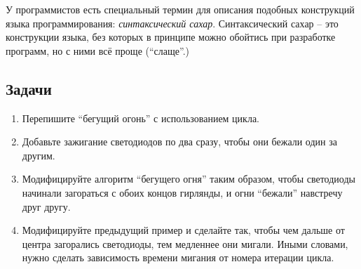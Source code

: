 \documentclass[../sparc.tex]{subfiles}
\begin{document}
У программистов есть специальный термин для описания подобных конструкций языка
программирования: \emph{синтаксический сахар}.  Синтаксический сахар -- это
конструкции языка, без которых в принципе можно обойтись при разработке
программ, но с ними всё проще (``слаще''.)

\subsection{Задачи}
\begin{enumerate}
\item Перепишите ``бегущий огонь'' с использованием цикла.
\item Добавьте зажигание светодиодов по два сразу, чтобы они бежали один за
  другим.
\item Модифицируйте алгоритм ``бегущего огня'' таким образом, чтобы светодиоды
  начинали загораться с обоих концов гирлянды, и огни ``бежали'' навстречу друг
  другу.
\item Модифицируйте предыдущий пример и сделайте так, чтобы чем дальше от центра
  загорались светодиоды, тем медленнее они мигали.  Иными словами, нужно сделать
  зависимость времени мигания от номера итерации цикла.
\end{enumerate}
\end{document}
